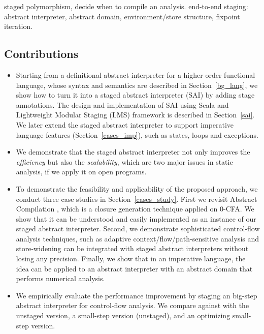 staged polymorphism, decide when to compile an analysis.  
end-to-end staging: abstract interpreter, abstract domain, environment/store structure, fixpoint iteration.

\subsection{Contributions}

\begin{itemize}
\item Starting from a definitional abstract interpreter for a higher-order functional language,
  whose syntax and semantics are described in Section~\ref{bg_lang},
  we show how to turn it into a staged abstract interpreter (SAI) by adding stage annotations. 
  The design and implementation of SAI using Scala and Lightweight Modular Staging (LMS) framework is 
  described in Section~\ref{sai}.
  We later extend the staged abstract interpreter to support imperative language features 
  (Section~\ref{cases_imp}), such as states, loops and exceptions.
\item We demonstrate that the staged abstract interpreter not only improves the \textit{efficiency}
  but also the \textit{scalability}, which are two major issues in static analysis, if we apply it on open
  programs. 
\item To demonstrate the feasibility and applicability of the proposed approach, we conduct three case studies in Section~\ref{cases_study}. 
  First we revisit Abstract Compilation \cite{Boucher:1996:ACN:647473.727587}, which is a closure generation 
  technique applied on 0-CFA. We show that it can be understood and easily implemented as an instance of 
  our staged abstract interpreter. 
  Second, we demonstrate sophisticated control-flow analysis techniques, such as adaptive context/flow/path-sensitive 
  analysis and store-widening can be integrated with staged abstract interpreters without losing any precision.
  Finally, we show that in an imperative language, the idea can be applied to an abstract interpreter with
  an abstract domain that performs numerical analysis.
\item We empirically evaluate the performance improvement by staging an big-step abstract interpreter 
  for control-flow analysis. We compare against with the unstaged version, a small-step version (unstaged), 
  and an optimizing small-step version.
\end{itemize}
